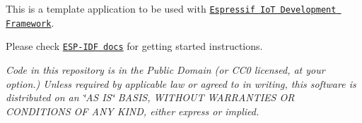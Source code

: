 This is a template application to be used with \href{https://github.com/espressif/esp-idf}{\tt Espressif IoT Development Framework}.

Please check \href{https://docs.espressif.com/projects/esp-idf/en/latest/get-started/index.html}{\tt E\+S\+P-\/\+I\+DF docs} for getting started instructions.

{\itshape Code in this repository is in the Public Domain (or C\+C0 licensed, at your option.) Unless required by applicable law or agreed to in writing, this software is distributed on an \char`\"{}\+A\+S I\+S\char`\"{} B\+A\+S\+IS, W\+I\+T\+H\+O\+UT W\+A\+R\+R\+A\+N\+T\+I\+ES OR C\+O\+N\+D\+I\+T\+I\+O\+NS OF A\+NY K\+I\+ND, either express or implied.} 